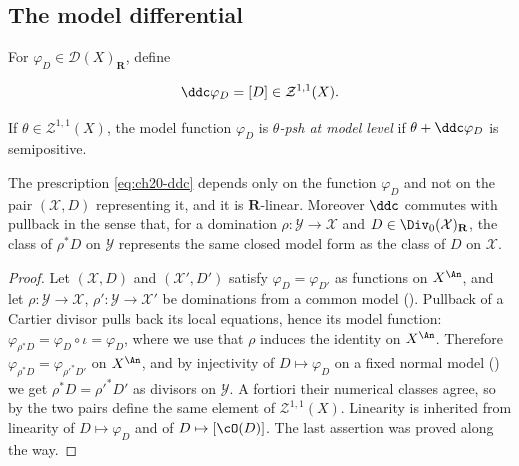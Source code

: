 \subsection{The model differential}
\label{sec:ch20-ddc-definition}

\begin{definition}
\label{def:ch20-ddc}
For $\varphi_D\in\mathcal D(X)_{\mathbf R}$, define

\begin{equation}
\label{eq:ch20-ddc}
                         \ddc\varphi_D=[D]
                         \in\mathcal Z^{1,1}(X).
\end{equation}

If $\theta\in\mathcal Z^{1,1}(X)$, the model function $\varphi_D$ is
\emph{$\theta$-psh at model level} if
$\theta+\ddc\varphi_D$ is semipositive.
\end{definition}

\begin{lemma}
\label{lem:ch20-ddc-well-defined}
The prescription \eqref{eq:ch20-ddc} depends only on the function
$\varphi_D$ and not on the pair $(\mathcal X,D)$ representing it, and it
is $\mathbf R$-linear.  Moreover $\ddc$ commutes with pullback in the
sense that, for a domination $\rho:\mathcal Y\to\mathcal X$ and
$D\in\Div_0(\mathcal X)_{\mathbf R}$, the class of $\rho^*D$ on
$\mathcal Y$ represents the same closed model form as the class of $D$
on $\mathcal X$.
\end{lemma}

\begin{proof}
Let $(\mathcal X,D)$ and $(\mathcal X',D')$ satisfy
$\varphi_D=\varphi_{D'}$ as functions on $X^{\An}$, and let
$\rho:\mathcal Y\to\mathcal X$, $\rho':\mathcal Y\to\mathcal X'$ be
dominations from a common model ().  Pullback
of a Cartier divisor pulls back its local equations, hence its model
function: $\varphi_{\rho^*D}=\varphi_D\circ\iota=\varphi_D$, where we use
that $\rho$ induces the identity on $X^{\An}$.  Therefore
$\varphi_{\rho^*D}=\varphi_{\rho'^*D'}$ on $X^{\An}$, and by injectivity
of $D\mapsto\varphi_D$ on a fixed normal model
() we get
$\rho^*D=\rho'^*D'$ as divisors on $\mathcal Y$.  A fortiori their
numerical classes agree, so by  the two
pairs define the same element of $\mathcal Z^{1,1}(X)$.  Linearity is
inherited from linearity of $D\mapsto\varphi_D$ and of
$D\mapsto[\cO(D)]$.  The last assertion was proved along the way.
\end{proof}

